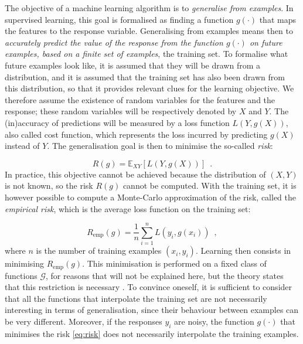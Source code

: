 The objective of a machine learning algorithm is to \textit{generalise from examples}. In supervised learning, this goal is formalised as finding a function $g(\cdot)$ that maps the features to the response variable. 
Generalising from examples means then to \textit{accurately predict the value of the response from the function $g(\cdot)$ on future examples, based on a finite set of examples}, the training set. 
To formalise what future examples look like, it is assumed that they will be drawn from a distribution, and it is assumed that the training set has also been drawn from this distribution, so that it provides relevant clues for the learning objective.
We therefore assume the existence of random variables for the features and the response; these random variables will be respectively denoted by $X$ and $Y$. The (in)accuracy of predictions will be measured by a loss function $L(Y,g(X))$, also called cost function, which represents the loss incurred by predicting $g(X)$ instead of $Y$. The generalisation goal is then to minimise the so-called \textit{risk}:

\begin{equation}\label{eq:risk}
    R(g) = \mathbb{E}_{XY}[ L(Y,g(X))]
    \enspace .
\end{equation}
In practice, this objective cannot be achieved because the distribution of $(X,Y)$ is not known, so the risk $R(g)$ cannot be computed.
With the training set, it is however possible to compute a Monte-Carlo approximation of the risk, called the \textit{empirical risk}, which is the average loss function on the training set:

\begin{equation*}
    R_\mathrm{emp}(g) = \frac{1}{n}\sum_{i=1}^{n}L(y_i,g(x_i)) \enspace,
\end{equation*}
where $n$ is the number of training examples $(x_i,y_i)$. 
Learning then consists in minimising $R_\mathrm{emp}(g)$. 
This minimisation is performed on a fixed class of functions $\mathcal{G}$, for reasons that will not be explained here, but the theory states that this restriction is necessary \citep{vapnik2000nature}. To convince oneself, it is sufficient to consider that all the functions that interpolate the training set are not necessarily interesting in terms of generalisation, since their behaviour between examples can be very different. Moreover, if the responses $y_i$ are noisy, the function $g(\cdot)$ that minimises the risk \eqref{eq:risk} does not necessarily interpolate the training examples.

